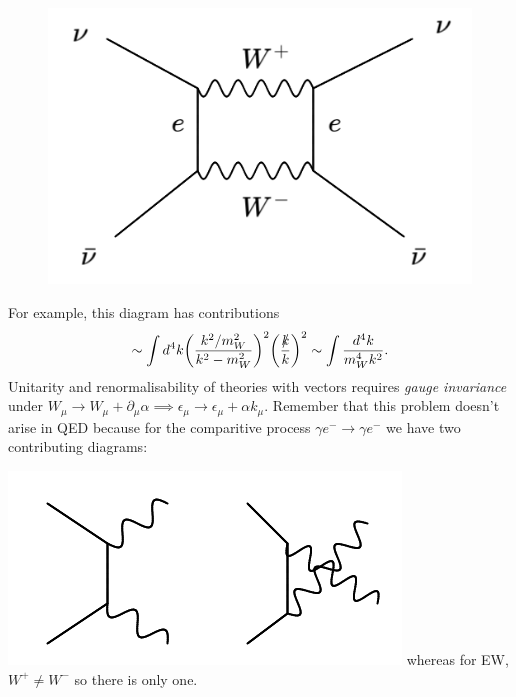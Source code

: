 \documentclass[a4paper,12pt]{article}
\begin{document}
%
\begin{figure}
  \centering
  \includegraphics[width=\linewidth]{figs/18b.png}
\end{figure}
%
For example, this diagram has contributions
\begin{equation}
\sim \int d^4k \bigg(\frac{k^2/m_W^2}{k^2-m_W^2}\bigg)^2 \bigg(\frac{\slashed{k}}{k}\bigg)^2 \sim \int \frac{d^4k}{m_W^4k^2}.
\end{equation}
Unitarity and renormalisability of theories with vectors requires \textit{gauge invariance} under $W_\mu \to W_\mu + \partial_\mu \alpha \implies \epsilon_\mu \to \epsilon_\mu + \alpha k_\mu$. 
Remember that this problem doesn't arise in QED because for the comparitive process $\gamma e^- \to \gamma e^-$ we have two contributing diagrams:

%
  \includegraphics[width=\linewidth]{figs/18c.png}
%
\newline
whereas for EW, $W^+ \neq W^-$ so there is only one.
\end{document}
